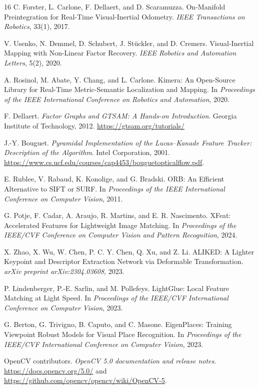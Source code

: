 \documentclass[10pt,a4paper]{article}
\begin{document}
\begin{thebibliography}{16}
C. Forster, L. Carlone, F. Dellaert, and D. Scaramuzza. On-Manifold Preintegration for Real-Time Visual-Inertial Odometry.
\emph{IEEE Transactions on Robotics}, 33(1), 2017.

V. Usenko, N. Demmel, D. Schubert, J. St\"uckler, and D. Cremers. Visual-Inertial Mapping with Non-Linear Factor Recovery.
\emph{IEEE Robotics and Automation Letters}, 5(2), 2020.

A. Rosinol, M. Abate, Y. Chang, and L. Carlone. Kimera: An Open-Source Library for Real-Time Metric-Semantic Localization and Mapping.
In \emph{Proceedings of the IEEE International Conference on Robotics and Automation}, 2020.

F. Dellaert. \emph{Factor Graphs and GTSAM: A Hands-on Introduction}.
Georgia Institute of Technology, 2012. \url{https://gtsam.org/tutorials/}

J.-Y. Bouguet. \emph{Pyramidal Implementation of the Lucas--Kanade Feature Tracker: Description of the Algorithm}.
Intel Corporation, 2001. \url{https://www.cs.ucf.edu/courses/cap4453/bouguetopticalflow.pdf}.

E. Rublee, V. Rabaud, K. Konolige, and G. Bradski. ORB: An Efficient Alternative to SIFT or SURF.
In \emph{Proceedings of the IEEE International Conference on Computer Vision}, 2011.

G. Potje, F. Cadar, A. Araujo, R. Martins, and E. R. Nascimento. XFeat: Accelerated Features for Lightweight Image Matching.
In \emph{Proceedings of the IEEE/CVF Conference on Computer Vision and Pattern Recognition}, 2024.

X. Zhao, X. Wu, W. Chen, P. C. Y. Chen, Q. Xu, and Z. Li. ALIKED: A Lighter Keypoint and Descriptor Extraction Network via Deformable Transformation.
\emph{arXiv preprint arXiv:2304.03608}, 2023.

P. Lindenberger, P.-E. Sarlin, and M. Pollefeys. LightGlue: Local Feature Matching at Light Speed.
In \emph{Proceedings of the IEEE/CVF International Conference on Computer Vision}, 2023.

G. Berton, G. Trivigno, B. Caputo, and C. Masone. EigenPlaces: Training Viewpoint Robust Models for Visual Place Recognition.
In \emph{Proceedings of the IEEE/CVF International Conference on Computer Vision}, 2023.

OpenCV contributors. \emph{OpenCV 5.0 documentation and release notes}. \url{https://docs.opencv.org/5.0/} and \url{https://github.com/opencv/opencv/wiki/OpenCV-5}.


\end{thebibliography}
\end{document}
